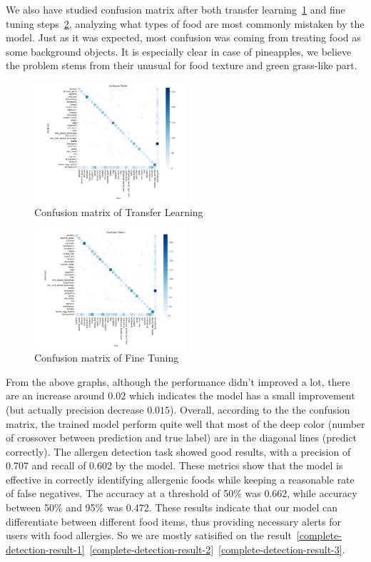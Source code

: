 \documentclass[10pt,twocolumn,letterpaper]{article}
\begin{document}
We also have studied confusion matrix after both transfer learning~\ref{transfer-learning-confusion} and fine tuning steps~\ref{fine-tuning-confusion}, analyzing what types of food are most commonly mistaken by the model.
Just as it was expected, most confusion was coming from treating food as some background objects.
It is especially clear in case of pineapples, we believe the problem stems from their unusual for food texture and green grass-like part.

\begin{figure}[htbp]
    \centering
    \includegraphics[width=0.5\textwidth]{4471_transfer_confusion.png}
    \caption{Confusion matrix of Transfer Learning}\label{transfer-learning-confusion}
\end{figure}
\begin{figure}[htbp]
    \centering
    \includegraphics[width=0.5\textwidth]{4471_finetuning_confusion.png}
    \caption{Confusion matrix of Fine Tuning}\label{fine-tuning-confusion}
\end{figure}

From the above graphs, although the performance didn't improved a lot, there are an increase around $0.02$ which indicates the model has a small improvement (but actually precision decrease $0.015$). 
Overall, according to the the confusion matrix, the trained model perform quite well that most of the deep color (number of crossover between prediction and true label) are in the diagonal lines (predict correctly). 
The allergen detection task showed good results, with a precision of 0.707 and recall of 0.602 by the model.
These metrics show that the model is effective in correctly identifying allergenic foods while keeping a reasonable rate of false negatives.
The accuracy at a threshold of 50\% was 0.662, while accuracy between 50\% and 95\% was 0.472.
These results indicate that our model can differentiate between different food items, thus providing necessary alerts for users with food allergies.
So we are mostly satisified on the result~\ref{complete-detection-result-1}~\ref{complete-detection-result-2}~\ref{complete-detection-result-3}.
\end{document}
